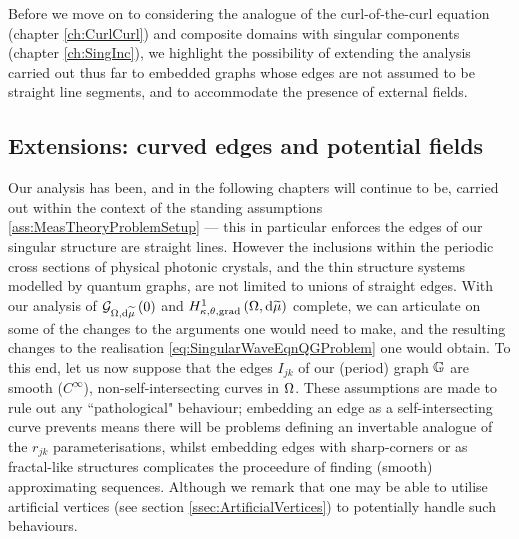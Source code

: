Before we move on to considering the analogue of the curl-of-the-curl equation (chapter \ref{ch:CurlCurl}) and composite domains with singular components (chapter \ref{ch:SingInc}), we highlight the possibility of extending the analysis carried out thus far to embedded graphs whose edges are not assumed to be straight line segments, and to accommodate the presence of external fields.

\subsection{Extensions: curved edges and potential fields} \label{ssec:CurvedEdges}
Our analysis has been, and in the following chapters will continue to be, carried out within the context of the standing assumptions \ref{ass:MeasTheoryProblemSetup} --- this in particular enforces the edges of our singular structure are straight lines.
However the inclusions within the periodic cross sections of physical photonic crystals, and the thin structure systems modelled by quantum graphs, are not limited to unions of straight edges.
With our analysis of $\mathcal{G}_{ \Omega, \mathrm{d}\widetilde{\mu}}\left( 0 \right)$ and $H^1_{\kappa,\theta,\mathrm{grad}}\left( \Omega, \mathrm{d}\widetilde{\mu} \right)$ complete, we can articulate on some of the changes to the arguments one would need to make, and the resulting changes to the realisation \eqref{eq:SingularWaveEqnQGProblem} one would obtain.
To this end, let us now suppose that the edges $I_{jk}$ of our (period) graph $\mathbb{G}$ are smooth ($C^{\infty}$), non-self-intersecting curves in $\Omega$.
These assumptions are made to rule out any ``pathological" behaviour; embedding an edge as a self-intersecting curve prevents means there will be problems defining an invertable analogue of the $r_{jk}$ parameterisations, whilst embedding edges with sharp-corners or as fractal-like structures complicates the proceedure of finding (smooth) approximating sequences.
Although we remark that one may be able to utilise artificial vertices (see section \ref{ssec:ArtificialVertices}) to potentially handle such behaviours.

